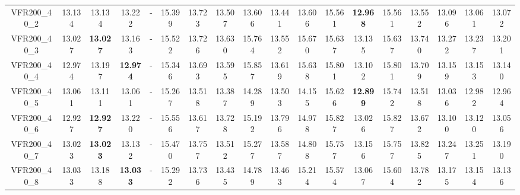 \begin{tabular}{cc|ccc|ccccccccccccc}
VFR200\_40\_2      & 13.134           & 13.134           & 13.222           & -                & 15.399           & 13.723           & 13.507           & 13.606           & 13.441           & 13.606           & 15.561           & {\bf 12.968}     & 15.561           & 13.552           & 13.096           & 13.061           & 13.072          \\ 
VFR200\_40\_3      & 13.027           & {\bf 13.027}     & 13.163           & -                & 15.522           & 13.726           & 13.630           & 15.764           & 13.552           & 15.670           & 15.637           & 13.135           & 15.637           & 13.740           & 13.272           & 13.237           & 13.201          \\ 
VFR200\_40\_4      & 12.974           & 13.197           & {\bf 12.974}     & -                & 15.346           & 13.693           & 13.595           & 15.857           & 13.619           & 15.638           & 15.801           & 13.102           & 15.801           & 13.709           & 13.159           & 13.153           & 13.140          \\ 
VFR200\_40\_5      & 13.061           & 13.111           & 13.061           & -                & 15.267           & 13.518           & 13.387           & 14.289           & 13.503           & 14.155           & 15.626           & {\bf 12.899}     & 15.742           & 13.518           & 13.036           & 12.982           & 12.964          \\ 
VFR200\_40\_6      & 12.927           & {\bf 12.927}     & 13.220           & -                & 15.556           & 13.617           & 13.728           & 15.192           & 13.796           & 14.978           & 15.827           & 13.026           & 15.827           & 13.672           & 13.100           & 13.120           & 13.056          \\ 
VFR200\_40\_7      & 13.023           & {\bf 13.023}     & 13.132           & -                & 15.470           & 13.757           & 13.512           & 15.277           & 13.587           & 14.808           & 15.757           & 13.156           & 15.757           & 13.825           & 13.247           & 13.251           & 13.190          \\ 
VFR200\_40\_8      & 13.033           & 13.188           & {\bf 13.033}     & -                & 15.292           & 13.736           & 13.435           & 14.789           & 13.463           & 15.214           & 15.574           & 13.067           & 15.604           & 13.782           & 13.175           & 13.154           & 13.136          \\ 

\end{tabular}
